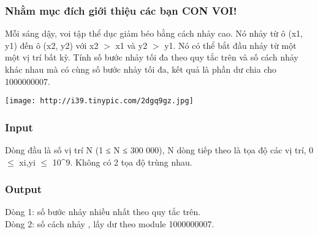 







\subsubsection{   Nhằm mục đích giới thiệu các bạn CON VOI!  }

   Mỗi sáng dậy, voi tập thể dục giảm béo bằng cách nhảy cao. Nó nhảy từ ô (x1, y1) đến ô (x2, y2) với x2 $>$ x1 và y2 $>$ y1. Nó có thể bắt đầu nhảy từ một một vị trí bất kỳ. Tính số bước nhảy tối đa theo quy tắc trên và số cách nhảy khác nhau mà có cùng số bước nhảy tối đa, kết quả là phần dư chia cho 1000000007.  

\href{http://tinypic.com}{}


\texttt{[image: http://i39.tinypic.com/2dgq9gz.jpg]}

\subsubsection{   Input  }

   Dòng đầu là số vị trí N (1 ≤ N ≤ 300 000), N dòng tiếp theo là tọa độ các vị trí, 0  $\le$ xi,yi $\le$ 10^9. Không có 2 tọa độ trùng nhau.  

\subsubsection{   Output  }

   Dòng 1: số bước nhảy nhiều nhất theo quy tắc trên.   
\\   Dòng 2: số cách nhảy , lấy dư theo module 1000000007.  

